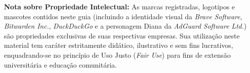 \vspace{0.5cm}
\begin{center}
	\scriptsize \textcolor{NordText!70}{
		\textbf{Nota sobre Propriedade Intelectual:} As marcas registradas, logotipos e mascotes contidos neste guia (incluindo a identidade visual da \textit{Brave Software}, \textit{Bitwarden Inc.}, \textit{DuckDuckGo} e a personagem Diana da \textit{AdGuard Software Ltd.}) são propriedades exclusivas de suas respectivas empresas. Sua utilização neste material tem caráter estritamente didático, ilustrativo e sem fins lucrativos, enquadrando-se no princípio de Uso Justo (\textit{Fair Use}) para fins de extensão universitária e educação comunitária.
	}
\end{center}